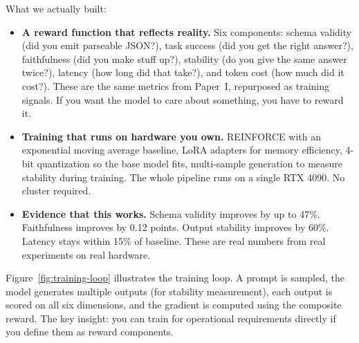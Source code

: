 \documentclass[11pt]{article}
\begin{document}
What we actually built:

\begin{itemize}[leftmargin=12pt]
    \item \textbf{A reward function that reflects reality.}
    Six components: schema validity (did you emit parseable JSON?), task success (did you get the right answer?), faithfulness (did you make stuff up?), stability (do you give the same answer twice?), latency (how long did that take?), and token cost (how much did it cost?).
    These are the same metrics from Paper~I, repurposed as training signals.
    If you want the model to care about something, you have to reward it.

    \item \textbf{Training that runs on hardware you own.}
    REINFORCE with an exponential moving average baseline, LoRA adapters for memory efficiency, 4-bit quantization so the base model fits, multi-sample generation to measure stability during training.
    The whole pipeline runs on a single RTX 4090.
    No cluster required.

    \item \textbf{Evidence that this works.}
    Schema validity improves by up to 47\%.
    Faithfulness improves by 0.12 points.
    Output stability improves by 60\%.
    Latency stays within 15\% of baseline.
    These are real numbers from real experiments on real hardware.
\end{itemize}

Figure~\ref{fig:training-loop} illustrates the training loop.
A prompt is sampled, the model generates multiple outputs (for stability measurement), each output is scored on all six dimensions, and the gradient is computed using the composite reward.
The key insight: you can train for operational requirements directly if you define them as reward components.
\end{document}
